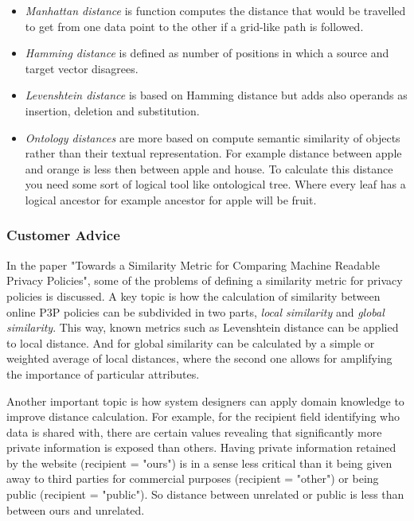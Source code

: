 \begin{itemize}
\item \emph{Manhattan distance} is function computes the distance that would be travelled to get from one data point to the other if a grid-like path is followed. 
\item \emph{Hamming distance} is defined as number of positions in which a source and target vector disagrees.
\item \emph{Levenshtein distance} is based on Hamming distance but adds also operands as insertion, deletion and substitution. 
\item \emph{Ontology distances} are more based on compute semantic similarity of objects rather than their textual representation. For example distance between apple and orange is less then between apple and house. To calculate this distance you need some sort of logical tool like ontological tree. Where every leaf has a logical ancestor for example ancestor for apple will be fruit.
\end{itemize}

\subsubsection{Customer Advice}

In the paper "Towards a Similarity Metric for Comparing Machine Readable Privacy Policies", some of the problems of defining a similarity metric for privacy policies is discussed. A key topic is how the calculation of similarity between online P3P policies can be subdivided in two parts, \emph{local similarity} and \emph{global similarity}. This way, known metrics such as Levenshtein distance  can be applied to local distance. And for global similarity can be calculated by a simple or weighted average of local distances, where the second one allows for amplifying the importance of particular attributes.

Another important topic is how system designers can apply domain knowledge to improve distance calculation. For example, for the recipient field identifying who data is shared with, there are certain values revealing that significantly more private information is exposed than others. Having private information retained by the website (recipient = "ours") is in a sense less critical than it being given away to third parties for commercial purposes (recipient = "other") or being public (recipient = "public"). So distance between unrelated or public is less than between ours and unrelated.

